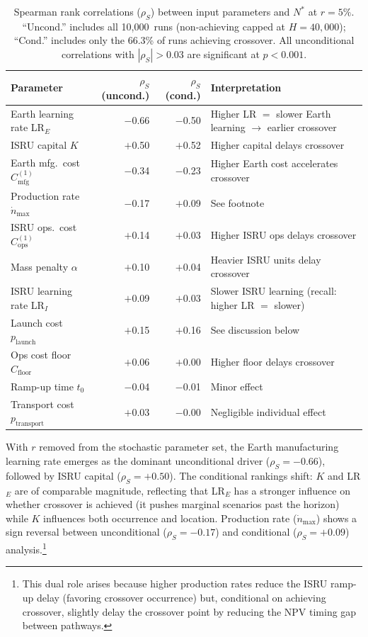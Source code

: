 \documentclass[preprint,12pt]{elsarticle}
\begin{document}
\begin{table}[htbp]
\centering
\caption{Spearman rank correlations ($\rho_S$) between input parameters and $N^*$ at $r = 5\%$. ``Uncond.'' includes all 10{,}000~runs (non-achieving capped at $H = 40{,}000$); ``Cond.'' includes only the 66.3\% of runs achieving crossover. All unconditional correlations with $|\rho_S| > 0.03$ are significant at $p < 0.001$.}
\label{tab:spearman}
\begin{tabular}{@{}lrrl@{}}
\toprule
Parameter & $\rho_S$ (uncond.) & $\rho_S$ (cond.) & Interpretation \\
\midrule
Earth learning rate LR$_E$     & $-$0.66 & $-$0.50 & Higher LR $=$ slower Earth learning $\rightarrow$ earlier crossover \\
ISRU capital $K$               & $+$0.50 & $+$0.52 & Higher capital delays crossover \\
Earth mfg.\ cost $C_{\mathrm{mfg}}^{(1)}$ & $-$0.34 & $-$0.23 & Higher Earth cost accelerates crossover \\
Production rate $\dot{n}_{\max}$ & $-$0.17 & $+$0.09 & See footnote \\
ISRU ops.\ cost $C_{\mathrm{ops}}^{(1)}$ & $+$0.14 & $+$0.03 & Higher ISRU ops delays crossover \\
Mass penalty $\alpha$          & $+$0.10 & $+$0.04 & Heavier ISRU units delay crossover \\
ISRU learning rate LR$_I$      & $+$0.09 & $+$0.03 & Slower ISRU learning (recall: higher LR $=$ slower) \\
Launch cost $p_{\mathrm{launch}}$   & $+$0.15 & $+$0.16 & See discussion below \\
Ops cost floor $C_{\mathrm{floor}}$ & $+$0.06 & $+$0.00 & Higher floor delays crossover \\
Ramp-up time $t_0$             & $-$0.04 & $-$0.01 & Minor effect \\
Transport cost $p_{\mathrm{transport}}$ & $+$0.03 & $-$0.00 & Negligible individual effect \\
\bottomrule
\end{tabular}
\end{table}

With $r$ removed from the stochastic parameter set, the Earth manufacturing learning rate emerges as the dominant unconditional driver ($\rho_S = -0.66$), followed by ISRU capital ($\rho_S = +0.50$). The conditional rankings shift: $K$ and LR$_E$ are of comparable magnitude, reflecting that LR$_E$ has a stronger influence on whether crossover is achieved (it pushes marginal scenarios past the horizon) while $K$ influences both occurrence and location. Production rate ($\dot{n}_{\max}$) shows a sign reversal between unconditional ($\rho_S = -0.17$) and conditional ($\rho_S = +0.09$) analysis.\footnote{This dual role arises because higher production rates reduce the ISRU ramp-up delay (favoring crossover occurrence) but, conditional on achieving crossover, slightly delay the crossover point by reducing the NPV timing gap between pathways.}
\end{document}
